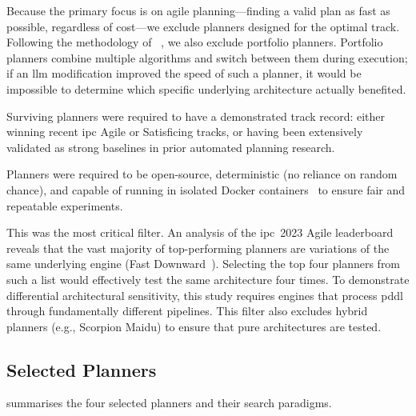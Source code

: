 \begin{description}[style=nextline, leftmargin=1.5cm]
  \item[\textbf{Filter~1} (Agile Planning, No Portfolios):]
    Because the primary focus is on agile planning---finding a valid plan as fast as possible, regardless of cost---we exclude planners designed for the optimal track.
    Following the methodology of \citeauthor{Elis2025}~\cite{Elis2025}, we also exclude portfolio planners.
    Portfolio planners combine multiple algorithms and switch between them during execution; if an \gls{llm} modification improved the speed of such a planner, it would be impossible to determine which specific underlying architecture actually benefited.

  \item[\textbf{Filter~2} (Proven Performance):]
    Surviving planners were required to have a demonstrated track record: either winning recent \gls{ipc} Agile or Satisficing tracks, or having been extensively validated as strong baselines in prior automated planning research.

  \item[\textbf{Filter~3} (Reproducibility):]
    Planners were required to be open-source, deterministic (no reliance on random chance), and capable of running in isolated Docker containers~\cite{Merkel2014} to ensure fair and repeatable experiments.

  \item[\textbf{Filter~4} (Distinct Architectures):]
    This was the most critical filter.
    An analysis of the \gls{ipc}~2023 Agile leaderboard~\cite{IPC2023Classical} reveals that the vast majority of top-performing planners are variations of the same underlying engine (Fast Downward~\cite{Helmert2006}).
    Selecting the top four planners from such a list would effectively test the same architecture four times.
    To demonstrate differential architectural sensitivity, this study requires engines that process \gls{pddl} through fundamentally different pipelines.
    This filter also excludes hybrid planners (e.g., Scorpion Maidu) to ensure that pure architectures are tested.
\end{description}

\subsection{Selected Planners}

 summarises the four selected planners and their search paradigms.

